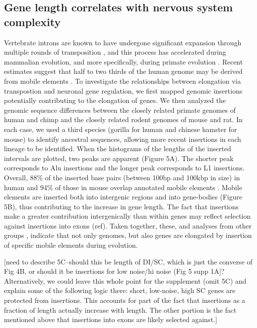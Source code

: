 \subsection{Gene length correlates with nervous system complexity}
Vertebrate introns are known to have undergone significant expansion through multiple rounds of transposition \cite{Grishkevich_2014}, and this process has accelerated during mammalian evolution, and more specifically, during primate evolution \cite{Friedli_2015}. Recent estimates suggest that half to two thirds of the human genome may be derived from mobile elements \cite{Friedli_2015}. %
To investigate the relationships between elongation via transpostion and neuronal gene regulation, we first mapped genomic insertions potentially contributing to the elongation of genes. We then analyzed the genomic sequence differences between the closely related primate genomes of human and chimp and the closely related rodent genomes of mouse and rat. In each case, we used a third species (gorilla for human and chinese hamster for mouse) to identify ancestral sequences, allowing more recent insertions in each lineage to be identified. When the histograms of the lengths of the inserted intervals are plotted, two peaks are apparent (Figure 5A). The shorter peak corresponds to Alu insertions and the longer peak corresponds to L1 insertions. Overall, 88\% of the inserted base pairs (between 100bp and 100kbp in size) in human and 94\% of those in mouse overlap annotated mobile elements \cite{Hubley_2015}. Mobile elements are inserted both into intergenic regions and into gene-bodies (Figure 5B), thus contributing to the increase in gene length. The fact that insertions make a greater contribution intergenically than within genes may reflect selection against insertions into exons (ref). Taken together, these, and analyses from other groups \citep{Grishkevich_2014,Chimpanzee_2005}, indicate that not only genomes, but also genes are elongated by insertion of specific mobile elements during evolution.

[need to describe 5C--should this be length of DI/SC, which is just the converse of Fig 4B, or should it be insertions for low noise/hi noise (Fig 5 supp 1A]? Alternatively, we could leave this whole point for the supplement (omit 5C) and explain some of the following logic there: short, low-noise, high SC genes are protected from insertions. This accounts for part of the fact that insertions as a fraction of length actually increase with length. The other portion is the fact mentioned above that insertions into exons are likely selected against.]


